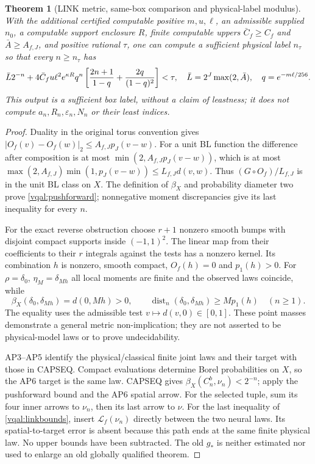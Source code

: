 \documentclass[11pt]{article}
\theoremstyle{plain}
\newtheorem{theorem}{Theorem}[section]
\theoremstyle{definition}
\theoremstyle{remark}
\begin{document}
\begin{theorem}[LINK metric, same-box comparison and physical-label modulus]
With the additional certified computable positive $m,u,\ell$, an
admissible supplied $n_0$, a computable support enclosure $R$, finite
computable uppers $\bar C_f\ge C_f$ and $\bar A\ge A_{f,J}$, and
positive rational $\tau$, one can compute a sufficient physical label
$n_\tau$ so that every $n\ge n_\tau$ has
\begin{equation}\label{vqal:physicalmodulus}
 \bar L2^{-n}+4\bar C_fu\ell^2e^{\kappa R}
 q^n\left[{2n+1\over1-q}+{2q\over(1-q)^2}\right]<\tau,
 \quad\bar L=2^J\max(2,\bar A),\quad q=e^{-m\ell/256}.
\end{equation}
This output is a sufficient box label, without a claim of leastness;
it does not compute $a_n,R_n,\varepsilon_n,N_n$ or their least indices.
\end{theorem}

\begin{proof}
Duality in the original torus convention gives
$|O_f(v)-O_f(w)|_2\le A_{f,J}p_J(v-w)$.
For a unit BL function the difference after composition is at most
$\min(2,A_{f,J}p_J(v-w))$, which is at most
$\max(2,A_{f,J})\min(1,p_J(v-w))\le L_{f,J}d(v,w)$.
Thus $(G\circ O_f)/L_{f,J}$ is in the unit BL class on $X$.
The definition of $\beta_X$ and probability diameter two prove
\eqref{vqal:pushforward}; nonnegative moment discrepancies give its
last inequality for every $n$.

For the exact reverse obstruction choose $r+1$ nonzero smooth bumps
with disjoint compact supports inside $(-1,1)^2$. The linear map from
their coefficients to their $r$ integrals against the tests has a
nonzero kernel. Its combination $h$ is nonzero, smooth compact,
$O_f(h)=0$ and $p_1(h)>0$. For
$\rho=\delta_0$, $\eta_M=\delta_{Mh}$ all local moments are finite
and the observed laws coincide, while
\begin{equation}\label{vqal:nonreverse}
 \beta_X(\delta_0,\delta_{Mh})=d(0,Mh)>0,\qquad
 \operatorname{dist}_n(\delta_0,\delta_{Mh})\ge Mp_1(h)
 \quad(n\ge1).
\end{equation}
The equality uses the admissible test $v\mapsto d(v,0)\in[0,1]$.
These point masses demonstrate a general metric non-implication; they
are not asserted to be physical-model laws or to prove undecidability.

AP3--AP5 identify the physical/classical finite joint laws and their
target with those in CAPSEQ. Compact evaluations determine Borel
probabilities on $X$, so the AP6 target is the same law. CAPSEQ gives
$\beta_X(C_n^b,\nu_n)<2^{-n}$; apply the pushforward bound and the
AP6 spatial arrow. For the selected tuple, sum its four inner arrows
to $\nu_n$, then its last arrow to $\nu$. For the last inequality
of \eqref{vqal:linkbounds}, insert $\mathcal L_f(\nu_n)$ directly
between the two neural laws. Its spatial-to-target error is absent
because this path ends at the same finite physical law. No upper
bounds have been subtracted. The old $g_*$ is neither estimated nor
used to enlarge an old globally qualified theorem.


\end{proof}
\end{document}
